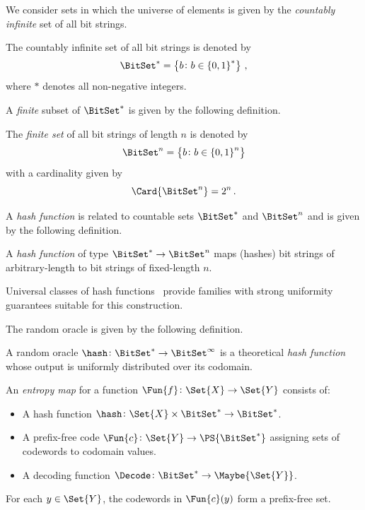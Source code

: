 \documentclass[ ../main.tex]{subfiles}
\begin{document}
We consider sets in which the universe of elements is given by the \emph{countably infinite} set of all bit strings.
\begin{definition}
The countably infinite set of all bit strings is denoted by
\begin{equation}
    \BitSet^* = \left\{b \colon b \in \left\{0,1\right\}^*\right\}\,,
\end{equation}
where $*$ denotes all non-negative integers.
\end{definition}
A \emph{finite} subset of $\BitSet^*$ is given by the following definition.
\begin{definition}
The \emph{finite set} of all bit strings of length $n$ is denoted by
\begin{equation}
    \BitSet^n = \left\{b \colon b \in \left\{0,1\right\}^n\right\}
\end{equation}
with a cardinality given by
\begin{equation}
    \Card{\BitSet^n} = 2^n\,.
\end{equation}
\end{definition}

A \emph{hash function} is related to countable sets $\BitSet^*$ and $\BitSet^n$ and is given by the following definition.
\begin{definition}
A \emph{hash function} of type $\BitSet^* \to \BitSet^n$ maps (hashes) bit strings of arbitrary-length to bit strings of fixed-length $n$.
\end{definition}
Universal classes of hash functions~\cite{carterWegman1979} provide families with strong uniformity guarantees suitable for this construction.

The random oracle is given by the following definition.
\begin{definition}
\label{def:randomoracle}
A random oracle $\hash \colon \BitSet^* \to \BitSet^{\infty}$ is a theoretical \emph{hash function} whose output is uniformly distributed over its codomain.
\end{definition}

\begin{definition}
\label{def:entropy-map}
An \emph{entropy map} for a function $\Fun{f} \colon \Set{X} \to \Set{Y}$
consists of:
\begin{itemize}
\item A hash function $\hash \colon \Set{X} \times \BitSet^{*} \to \BitSet^{*}$.
\item A prefix-free code $\Fun{c} \colon \Set{Y} \to \PS{\BitSet^{*}}$
      assigning sets of codewords to codomain values.
\item A decoding function $\Decode \colon \BitSet^{*} \to \Maybe{\Set{Y}}$.
\end{itemize}
For each $y \in \Set{Y}$, the codewords in $\Fun{c}(y)$ form a prefix-free set.
\end{definition}
\end{document}
